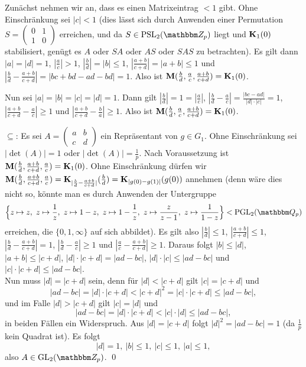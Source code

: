\documentclass[a4paper, 12pt, twoside]{article}
\begin{document}
Zunächst nehmen wir an, dass es einen Matrixeintrag $<1$ gibt.
Ohne Einschränkung sei $|c|<1$ (dies lässt sich durch Anwenden einer
Permutation $S=\begin{pmatrix}
0 & 1 \\
1 & 0
\end{pmatrix}$
erreichen, und da $S\in\PSL_2(\ZZ_p)$ liegt und $\mathbf{K}_1(0)$ 
stabilisiert, genügt es $A$ oder $SA$ oder $AS$ oder $SAS$ zu
betrachten).
Es gilt dann $|a|=|d|=1$, $|\frac{a}{c}|>1$,
$|\frac{b}{d}|=|b|\leq 1$, $|\frac{a+b}{c+d}|=|a+b|\leq 1$ und
$|\frac{b}{d}-\frac{a+b}{c+d}|=|bc+bd-ad-bd|=1$.
Also ist $\mathbf{M}(\frac{b}{d},\frac{a}{c},\frac{a+b}{c+d})=\mathbf{K}_1(0)$.

Nun sei $|a|=|b|=|c|=|d|=1$.
Dann gilt $|\frac{b}{d}|=1=|\frac{a}{c}|$,
$|\frac{b}{d}-\frac{a}{c}|=\frac{|bc-ad|}{|d|\cdot|c|}=1$,
$|\frac{a+b}{c+d}-\frac{a}{c}|\geq 1$ und
$|\frac{a+b}{c+d}-\frac{b}{a}|\geq 1$. Also ist
$\mathbf{M}(\frac{b}{d},\frac{a}{c},\frac{a+b}{c+d})=\mathbf{K}_1(0)$.

\glqq$\subseteq$\grqq:
Es sei $A=\begin{pmatrix}
a & b \\
c & d
\end{pmatrix}$ ein Repräsentant von $g\in G_1$.
Ohne Einschränkung sei $|\det(A)|=1$ oder $|\det(A)|=\frac{1}{p}$.
Nach Voraussetzung ist
$\mathbf{M}(\frac{b}{d},\frac{a+b}{c+d},\frac{a}{c})=\mathbf{K}_1(0)$.
Ohne Einschränkung dürfen wir
$\mathbf{M}(\frac{b}{d},\frac{a+b}{c+d},\frac{a}{c})
=\mathbf{K}_{|\frac{b}{d}-\frac{a+b}{c+d}|}(\frac{b}{d})
=\mathbf{K}_{|g(0)-g(1)|}(g(0))$ annehmen
(denn wäre dies nicht so, könnte man es durch Anwenden der Untergruppe
\[
\Bigl\{z\mapsto z,\ z\mapsto\frac{1}{z},\
 z\mapsto 1-z,\ z\mapsto 1-\frac{1}{z},\
 z\mapsto \frac{z}{z-1},\ z\mapsto\frac{1}{1-z}
 \Bigr\}
 < \PGL_2(\QQ_p)
\]
erreichen, die $\{0,1,\infty\}$ auf sich abbildet).
Es gilt also $|\frac{b}{d}|\leq 1$, $|\frac{a+b}{c+d}|\leq 1$,
$|\frac{b}{d}-\frac{a+b}{c+d}|=1$, $|\frac{b}{d}-\frac{a}{c}|\geq 1$
und $|\frac{a}{c}-\frac{a+b}{c+d}|\geq 1$.
Daraus folgt
$|b|\leq |d|$, $|a+b|\leq|c+d|$, $|d|\cdot|c+d|=|ad-bc|$,
$|d|\cdot|c|\leq|ad-bc|$ und $|c|\cdot|c+d|\leq|ad-bc|$.\\
Nun muss $|d|=|c+d|$ sein, denn für $|d|<|c+d|$ gilt $|c|=|c+d|$
und
\[
|ad-bc|=|d|\cdot|c+d|<|c+d|^2=|c|\cdot|c+d|\leq|ad-bc|,
\]
und im Falle $|d|>|c+d|$ gilt $|c|=|d|$ und
\[
|ad-bc|=|d|\cdot|c+d|<|c|\cdot|d|\leq|ad-bc|,
\]
in beiden Fällen ein Widerspruch.
Aus $|d|=|c+d|$ folgt $|d|^2=|ad-bc|=1$ (da $\frac{1}{p}$ kein Quadrat 
ist). Es folgt
\[
|d|=1,\ |b|\leq 1,\ |c|\leq 1,\ |a|\leq 1,
\]
also $A\in\GL_2(\ZZ_p)$.
\qed
\end{document}
